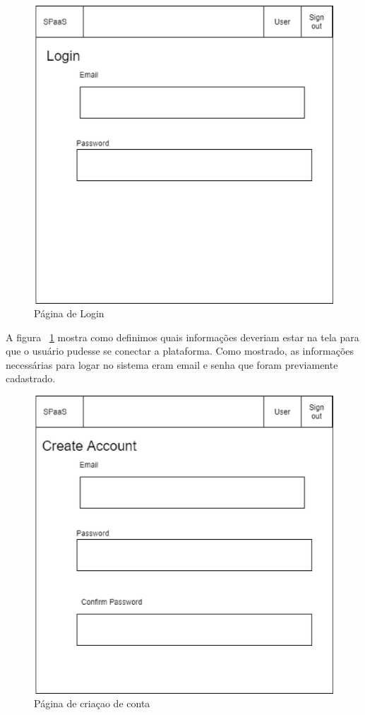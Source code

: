 \documentclass[11pt,twoside]{article}
\begin{document}
\begin{figure}[!h]
  \centering
  \includegraphics[scale=0.4]{login.eps}
  \caption{Página de Login}
  \label{fig:loginScreen}
\end{figure}

A figura ~\ref{fig:loginScreen} mostra como definimos quais informações deveriam estar na tela para que o usuário pudesse se conectar a plataforma. Como mostrado, 
as informações necessárias para logar no sistema eram email e senha que foram previamente cadastrado.

\begin{figure}[!h]
  \centering
  \includegraphics[scale=0.4]{account_reg.eps}
  \caption{Página de criaçao de conta}
  \label{fig:createScreen}
\end{figure}
\end{document}
